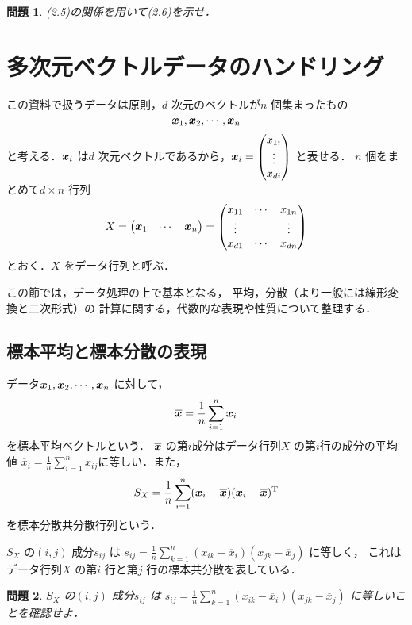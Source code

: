 \documentclass[11pt,ascmac]{jsarticle}
\newtheorem{pr}{\bf 問題}[section]
\newcommand{\vx}{\mbox{{\boldmath $x$}}}
\begin{document}
\begin{pr}
(2.5)の関係を用いて(2.6)を示せ．
\end{pr}

\section{多次元ベクトルデータのハンドリング}

この資料で扱うデータは原則，$d$ 次元のベクトルが$n$ 個集まったもの
$$\vx_1, \vx_2, \cdots , \vx_n$$
と考える．$\vx_i$ は$d$ 次元ベクトルであるから，$\vx_i =
\begin{pmatrix}x_{1i}\\\vdots\\x_{di}\end{pmatrix}$
と表せる．
$n$ 個をまとめて$d \times n$ 行列
$$X =\begin{pmatrix}\vx_1&\cdots&\vx_n\end{pmatrix}
=\begin{pmatrix}
x_{11}&\cdots&x_{1n}\\
\vdots&&\vdots\\
x_{d1}&\cdots&x_{dn}
\end{pmatrix}$$
とおく．$X$ をデータ行列と呼ぶ．

この節では，データ処理の上で基本となる，
平均，分散（より一般には線形変換と二次形式）の
計算に関する，代数的な表現や性質について整理する．

\subsection{標本平均と標本分散の表現}

データ$\vx_1, \vx_2,\cdots, \vx_n$ に対して，
\begin{equation}
\overline{\vx} =\frac1n\sum_{i=1}^n \vx_i
\end{equation}
を標本平均ベクトルという．
$\overline{\vx}$ の第$i$成分はデータ行列$X$ の第$i$行の成分の平均値
$\overline{x}_i=\frac1n\sum_{i=1}^n x_{ij}$に等しい．また，
\begin{equation}
S_X =\frac1n\sum_{i=1}^n (\vx_i-\overline{\vx})(\vx_i-\overline{\vx})^{\rm T}
\end{equation}
を標本分散共分散行列という．

$S_X$ の$(i, j)$ 成分$s_{ij}$ は
$s_{ij} =\frac1n\sum_{k=1}^n(x_{ik} − \overline{x}_i)(x_{jk} − \overline{x}_j)$ に等しく，
これはデータ行列$X$ の第$i$ 行と第$j$ 行の標本共分散を表している．

\begin{pr}
$S_X$ の$(i, j)$ 成分$s_{ij}$ は
$s_{ij} =\frac1n\sum_{k=1}^n(x_{ik} − \overline{x}_i)(x_{jk} − \overline{x}_j)$ 
に等しいことを確認せよ．
\end{pr}
\end{document}

